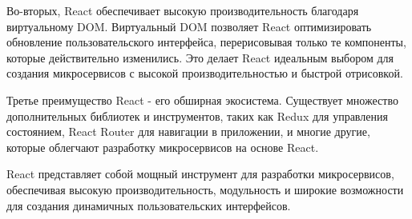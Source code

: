 Во-вторых, React обеспечивает высокую производительность благодаря виртуальному DOM. Виртуальный DOM позволяет React оптимизировать обновление пользовательского интерфейса, перерисовывая только те компоненты, которые действительно изменились. Это делает React идеальным выбором для создания микросервисов с высокой производительностью и быстрой отрисовкой.

Третье преимущество React - его обширная экосистема. Существует множество дополнительных библиотек и инструментов, таких как Redux для управления состоянием, React Router для навигации в приложении, и многие другие, которые облегчают разработку микросервисов на основе React.

React представляет собой мощный инструмент для разработки микросервисов, обеспечивая высокую производительность, модульность и широкие возможности для создания динамичных пользовательских интерфейсов.